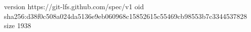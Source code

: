 version https://git-lfs.github.com/spec/v1
oid sha256:d38f0c508a024da5136e9eb060968c15852615c55469cb98553b7c3344537828
size 1938
